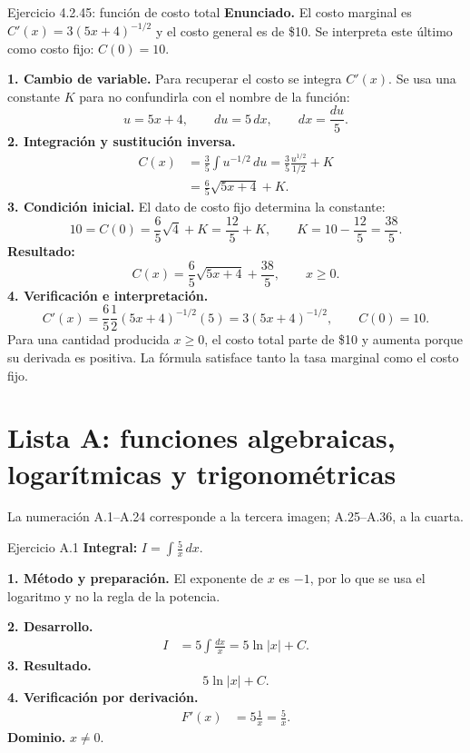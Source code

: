 \begin{examplebox}{Ejercicio 4.2.45: función de costo total}
\textbf{Enunciado.} El costo marginal es $C'(x)=3(5x+4)^{-1/2}$ y el costo general es de \$10. Se interpreta este último como costo fijo: $C(0)=10$.

\textbf{1. Cambio de variable.} Para recuperar el costo se integra $C'(x)$. Se usa una constante $K$ para no confundirla con el nombre de la función:
\[
 u=5x+4,\qquad du=5\,dx,\qquad dx=\frac{du}{5}.
\]
\textbf{2. Integración y sustitución inversa.}
\begin{align*}
 C(x)&=\frac35\int u^{-1/2}\,du
 =\frac35\frac{u^{1/2}}{1/2}+K\\
 &=\frac65\sqrt{5x+4}+K.
\end{align*}
\textbf{3. Condición inicial.} El dato de costo fijo determina la constante:
\[
 10=C(0)=\frac65\sqrt4+K=\frac{12}5+K,
 \qquad K=10-\frac{12}5=\frac{38}5.
\]
\textbf{Resultado:}
\[
 \boxed{C(x)=\frac65\sqrt{5x+4}+\frac{38}5},\qquad x\ge0.
\]
\textbf{4. Verificación e interpretación.}
\[
 C'(x)=\frac65\frac12(5x+4)^{-1/2}(5)
 =3(5x+4)^{-1/2},\qquad C(0)=10.
\]
Para una cantidad producida $x\ge0$, el costo total parte de \$10 y aumenta porque su derivada es positiva. La fórmula satisface tanto la tasa marginal como el costo fijo.
\end{examplebox}


\clearpage
\section{Lista A: funciones algebraicas, logarítmicas y trigonométricas}

La numeración A.1--A.24 corresponde a la tercera imagen; A.25--A.36, a la cuarta.

\begin{examplebox}{Ejercicio A.1}
\textbf{Integral:} $\displaystyle I=\int \frac5x\,dx$.

\textbf{1. Método y preparación.} El exponente de $x$ es $-1$, por lo que se usa el logaritmo y no la regla de la potencia.

\textbf{2. Desarrollo.}
\begin{align*}
I&=5\int\frac{dx}{x}=5\ln|x|+C.
\end{align*}
\textbf{3. Resultado.}
\[
5\ln|x|+C.
\]
\textbf{4. Verificación por derivación.}
\begin{align*}
F'(x)&=5\frac1x=\frac5x.
\end{align*}
\textbf{Dominio.} $x\ne0$.
\end{examplebox}

